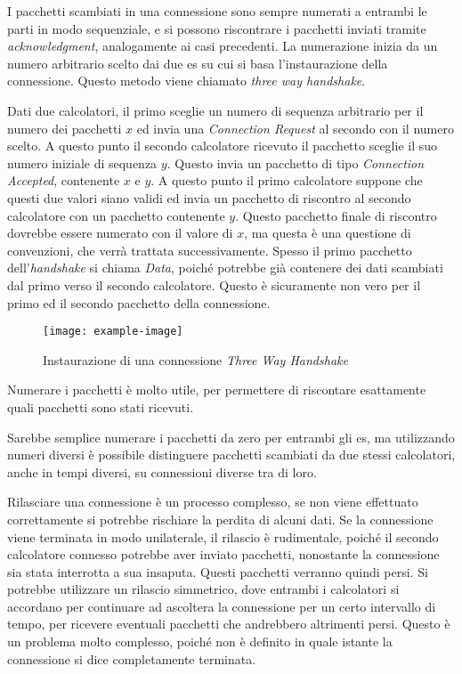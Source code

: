 \documentclass{article}
\numberwithin{equation}{subsection}
\begin{document}
I pacchetti scambiati in una connessione sono sempre numerati a entrambi le parti in modo sequenziale, e si possono riscontrare i pacchetti inviati tramite 
\textit{acknowledgment}, analogamente ai casi precedenti. La numerazione inizia da un numero arbitrario scelto dai due \textcolor{Periwinkle}{es} su cui si basa l'instaurazione della connessione. Questo metodo viene chiamato \textit{three way handshake}. 

Dati due calcolatori, il primo sceglie un numero di sequenza arbitrario per il numero dei pacchetti $x$ ed invia una \textit{Connection Request} al secondo con il numero scelto. 
A questo punto il secondo calcolatore ricevuto il pacchetto sceglie il suo numero iniziale di sequenza $y$. Questo invia un pacchetto di tipo \textit{Connection Accepted}, 
contenente $x$ e $y$. A questo punto il primo calcolatore suppone che questi due valori siano validi ed invia un pacchetto di riscontro al secondo calcolatore con 
un pacchetto contenente $y$. Questo pacchetto finale di riscontro dovrebbe essere numerato con il valore di $x$, ma questa è una questione di convenzioni, che verrà trattata successivamente. Spesso 
il primo pacchetto dell'\textit{handshake} si chiama \textit{Data}, poiché potrebbe già contenere dei dati scambiati dal primo verso il secondo calcolatore. Questo è sicuramente non vero per il primo 
ed il secondo pacchetto della connessione. 

\begin{figure}[H]%
    \centering%
    \texttt{[image: example-image]}%
    \caption{Instaurazione di una connessione \textit{Three Way Handshake}}%
\end{figure}

Numerare i pacchetti è molto utile, per permettere di riscontare esattamente quali pacchetti sono stati ricevuti. 

Sarebbe semplice numerare i pacchetti da zero per entrambi gli \textcolor{Periwinkle}{es}, ma utilizzando numeri diversi è possibile distinguere pacchetti scambiati da due stessi 
calcolatori, anche in tempi diversi, su connessioni diverse tra di loro. 

Rilasciare una connessione è un processo complesso, se non viene effettuato correttamente si potrebbe rischiare la perdita di alcuni dati. Se la connessione viene 
terminata in modo unilaterale, il rilascio è rudimentale, poiché il secondo calcolatore connesso potrebbe aver inviato pacchetti, nonostante la connessione sia stata 
interrotta a sua insaputa. Questi pacchetti verranno quindi persi. 
Si potrebbe utilizzare un rilascio simmetrico, dove entrambi i calcolatori si accordano per continuare ad ascoltera la connessione per un certo intervallo di tempo, per ricevere eventuali pacchetti che andrebbero altrimenti persi. Questo è un problema molto complesso, poiché non è definito in quale istante la connessione si dice completamente 
terminata. 
\end{document}
